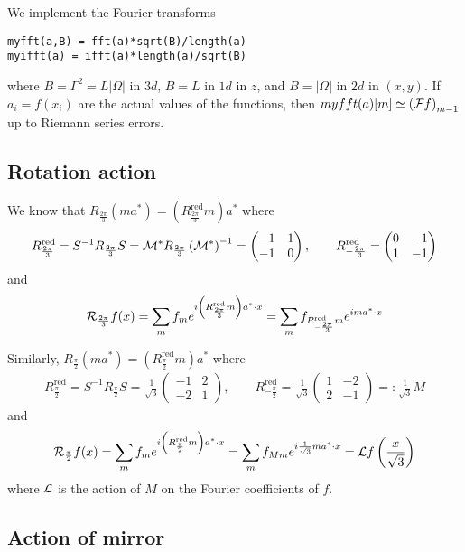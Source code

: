 \documentclass[11pt,a4paper,reqno,french,tikz]{amsart}
\newcommand{\pa}[1]{\left( #1 \right)} %
\newcommand{\ab}[1]{\left|#1\right|} %
\newcommand{\f}[2]{\frac{#1}{#2}} %
\newcommand{\mat}[1]{\begin{pmatrix} #1 \end{pmatrix}} %
\begin{document}
We implement the Fourier transforms
\begin{lstlisting}
myfft(a,B) = fft(a)*sqrt(B)/length(a)
myifft(a) = ifft(a)*length(a)/sqrt(B)
\end{lstlisting}
where $B = \Gamma^2 = L \ab{\Omega}$ in $3d$, $B = L$ in $1d$ in $z$, and $B=\ab{\Omega}$ in $2d$ in $(x,y)$. If $a_i = f(x_i)$ are the actual values of the functions, then $myfft(a)[m] \simeq \pa{\cF f}_{m-1}$ up to Riemann series errors.


\subsection{Rotation action}%
\label{sub:rotation_action}


We know that $R_{\f{2\pi}3} \pa{ma^* } = \pa{R_{\f{2\pi}3}^{\text{red}} m} a^*$ where
\begin{align*}
	R_{\f{2\pi}3}^{\text{red}} = S^{-1} R_{\f{2\pi}3} S =  \cM^* R_{\f{2\pi}3} \pa{\cM^*}^{-1} = \mat{-1 & 1 \\ -1 & 0}, \qquad R_{-\f{2\pi}3}^{\text{red}} = \mat{0 & -1 \\ 1 & -1}
\end{align*}
and
\begin{align*}
\cR_{\f{2\pi}3} f(x) = \sum_m f_m e^{i \pa{R_{\f{2\pi}3}^{\text{red}} m} a^* \cdot x} = \sum_m f_{R_{-\f{2\pi}3}^{\text{red}} m} e^{im a^* \cdot x}
\end{align*}

Similarly, $R_{\f{\pi}2}  \pa{ma^* } = \pa{R_{\f{\pi}2}^{\text{red}} m} a^*$ where
\begin{align*}
	R_{\f{\pi}2} ^{\text{red}} = S^{-1} R_{\f{\pi}2}  S = \f{1}{\sqrt 3} \mat{-1 & 2 \\ -2 & 1}, \qquad R_{-\f{\pi}2}^{\text{red}} = \f{1}{\sqrt 3} \mat{1 & -2 \\ 2 & -1} =: \f{1}{\sqrt 3} M
\end{align*}
and
\begin{align*}
\cR_{\f{\pi}2} f(x) = \sum_m f_m e^{i \pa{R_{\f{\pi}2}^{\text{red}} m} a^* \cdot x} = \sum_m f_{M m} e^{i \f{1}{\sqrt 3} m a^* \cdot x} = \cL f\pa{\f{x}{\sqrt 3}}
\end{align*}
where $\mathcal{L}$ is the action of $M$ on the Fourier coefficients of $f$.

\subsection{Action of mirror}%
\label{sub:action_of_mirror}
\end{document}
